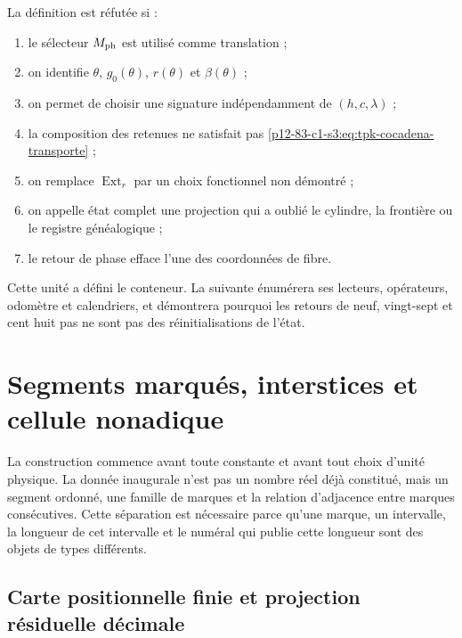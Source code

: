 {\begin{criterion}
La définition est réfutée si :
\begin{enumerate}
 \item le sélecteur \(M_{\rm ph}\) est utilisé comme translation ;
 \item on identifie \(\theta\), \(g_0(\theta)\), \(r(\theta)\) et
       \(\beta(\theta)\) ;
 \item on permet de choisir une signature indépendamment de
       \((h,c,\lambda)\) ;
 \item la composition des retenues ne satisfait pas
       \cref{p12-83-c1-s3:eq:tpk-cocadena-transporte} ;
 \item on remplace \(\operatorname{Ext}_r\) par un choix fonctionnel non
       démontré ;
 \item on appelle état complet une projection qui a oublié le cylindre,
       la frontière ou le registre généalogique ;
 \item le retour de phase efface l’une des coordonnées de fibre.
\end{enumerate}
\end{criterion}

Cette unité a défini le conteneur. La suivante énumérera ses lecteurs,
opérateurs, odomètre et calendriers, et démontrera pourquoi les retours de
neuf, vingt-sept et cent huit pas ne sont pas des réinitialisations de l’état.
}%



\section{Segments marqués, interstices et cellule nonadique}
\label{p12-83-c1-s4:chap:segmentos-marcas-intersticios}

La construction commence avant toute constante et avant tout choix
d’unité physique. La donnée inaugurale n’est pas un nombre réel déjà constitué, mais un
segment ordonné, une famille de marques et la relation d’adjacence entre
marques consécutives. Cette séparation est nécessaire parce qu’une marque, un
intervalle, la longueur de cet intervalle et le numéral qui publie cette
longueur sont des objets de types différents.

\subsection{Carte positionnelle finie et projection résiduelle décimale}

